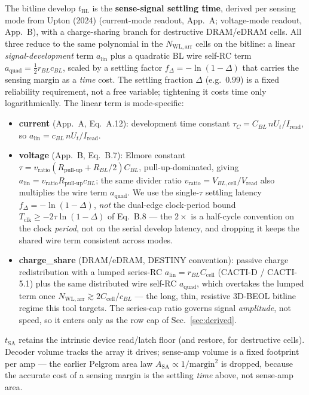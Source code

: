 \documentclass[11pt]{article}
\newcommand{\Nwl}{N_{\mathrm{WL,arr}}}
\newcommand{\tbl}{t_{\mathrm{BL}}}
\newcommand{\tsa}{t_{\mathrm{SA}}}
\newcommand{\Asa}{A_{\mathrm{SA}}}
\begin{document}
The bitline develop $\tbl$ is the \textbf{sense-signal settling time}, derived
per sensing mode from Upton (2024) (current-mode readout, App.~A; voltage-mode
readout, App.~B), with a charge-sharing branch for destructive DRAM/eDRAM cells.
All three reduce to the same polynomial in the $\Nwl$ cells on the bitline: a
linear \emph{signal-development} term $a_{\mathrm{lin}}$ plus a quadratic BL wire
self-RC term $a_{\mathrm{quad}}=\tfrac12 r_{BL}c_{BL}$, scaled by a settling
factor $f_\Delta=-\ln(1-\Delta)$ that carries the sensing margin as a \emph{time}
cost. The settling fraction $\Delta$ (e.g.\ $0.99$) is a fixed reliability
requirement, not a free variable; tightening it costs time only
logarithmically. The linear term is mode-specific:
\begin{itemize}[nosep]
  \item \textbf{current} (App.~A, Eq.~A.12): development time constant
        $\tau_C=C_{BL}\,nU_t/I_{\mathrm{read}}$, so
        $a_{\mathrm{lin}}=c_{BL}\,nU_t/I_{\mathrm{read}}$.
  \item \textbf{voltage} (App.~B, Eq.~B.7): Elmore constant
        $\tau=v_{\mathrm{ratio}}(R_{\text{pull-up}}+R_{BL}/2)C_{BL}$,
        pull-up-dominated, giving
        $a_{\mathrm{lin}}=v_{\mathrm{ratio}}R_{\text{pull-up}}c_{BL}$; the same
        divider ratio $v_{\mathrm{ratio}}=V_{BL,\mathrm{cell}}/V_{\mathrm{read}}$
        also multiplies the wire term $a_{\mathrm{quad}}$. We use the single-$\tau$
        settling latency $f_\Delta=-\ln(1-\Delta)$, \emph{not} the dual-edge
        clock-period bound $T_{\mathrm{clk}}\ge-2\tau\ln(1-\Delta)$ of Eq.~B.8
        --- the $2\times$ is a half-cycle convention on the clock \emph{period},
        not on the serial develop latency, and dropping it keeps the shared wire
        term consistent across modes.
  \item \textbf{charge\_share} (DRAM/eDRAM, DESTINY convention): passive charge
        redistribution with a lumped series-RC
        $a_{\mathrm{lin}}=r_{BL}C_{\mathrm{cell}}$ (CACTI-D / CACTI-5.1) plus the
        same distributed wire self-RC $a_{\mathrm{quad}}$, which overtakes the
        lumped term once $\Nwl\gtrsim 2C_{\mathrm{cell}}/c_{BL}$ --- the long,
        thin, resistive 3D-BEOL bitline regime this tool targets. The
        series-cap ratio governs signal \emph{amplitude}, not speed, so it
        enters only as the row cap of Sec.~\ref{sec:derived}.
\end{itemize}
$\tsa$ retains the intrinsic device read/latch floor (and restore, for
destructive cells). Decoder volume tracks the array it drives; sense-amp volume
is a fixed footprint per amp --- the earlier Pelgrom area law
$\Asa\propto1/\mathrm{margin}^2$ is dropped, because the accurate cost of a
sensing margin is the settling \emph{time} above, not sense-amp area.
\end{document}
